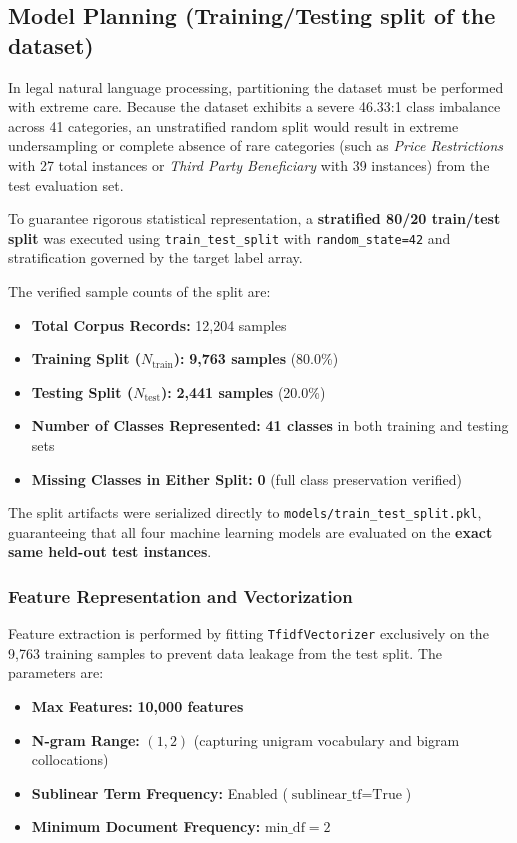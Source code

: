\subsection{Model Planning (Training/Testing split of the dataset)}
\label{subsec:model_planning}
In legal natural language processing, partitioning the dataset must be performed with extreme care. Because the dataset exhibits a severe 46.33:1 class imbalance across 41 categories, an unstratified random split would result in extreme undersampling or complete absence of rare categories (such as \textit{Price Restrictions} with 27 total instances or \textit{Third Party Beneficiary} with 39 instances) from the test evaluation set.

To guarantee rigorous statistical representation, a \textbf{stratified 80/20 train/test split} was executed using \texttt{train\_test\_split} with \texttt{random\_state=42} and stratification governed by the target label array.

The verified sample counts of the split are:
\begin{itemize}
    \item \textbf{Total Corpus Records:} 12,204 samples
    \item \textbf{Training Split ($N_{\text{train}}$):} \textbf{9,763 samples} (80.0\%)
    \item \textbf{Testing Split ($N_{\text{test}}$):} \textbf{2,441 samples} (20.0\%)
    \item \textbf{Number of Classes Represented:} \textbf{41 classes} in both training and testing sets
    \item \textbf{Missing Classes in Either Split:} \textbf{0} (full class preservation verified)
\end{itemize}

The split artifacts were serialized directly to \texttt{models/train\_test\_split.pkl}, guaranteeing that all four machine learning models are evaluated on the \textbf{exact same held-out test instances}.

\subsubsection*{Feature Representation and Vectorization}
Feature extraction is performed by fitting \texttt{TfidfVectorizer} exclusively on the 9,763 training samples to prevent data leakage from the test split. The parameters are:
\begin{itemize}
    \item \textbf{Max Features:} \textbf{10,000 features}
    \item \textbf{N-gram Range:} $(1, 2)$ (capturing unigram vocabulary and bigram collocations)
    \item \textbf{Sublinear Term Frequency:} Enabled ($\text{sublinear\_tf} = \text{True}$)
    \item \textbf{Minimum Document Frequency:} $\text{min\_df} = 2$
\end{itemize}

